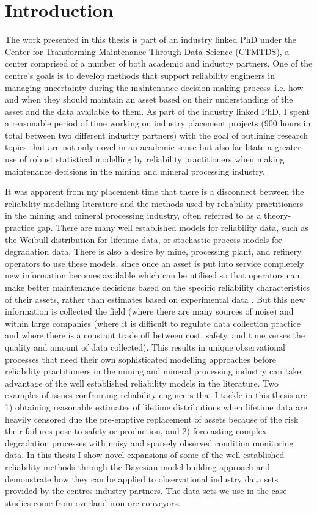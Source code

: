 \chapter{Introduction}\label{chap:chapter1}

The work presented in this thesis is part of an industry linked PhD under the Center for Transforming Maintenance Through Data Science (CTMTDS), a center comprised of a number of both academic and industry partners. One of the centre's goals is to develop methods that support reliability engineers in managing uncertainty during the maintenance decision making process--i.e. how and when they should maintain an asset based on their understanding of the asset and the data available to them. As part of the industry linked PhD, I spent a reasonable period of time working on industry placement projects (900 hours in total between two different industry partners) with the goal of outlining research topics that are not only novel in an academic sense but also facilitate a greater use of robust statistical modelling by reliability practitioners when making maintenance decisions in the mining and mineral processing industry.

It was apparent from my placement time that there is a disconnect between the reliability modelling literature and the methods used by reliability practitioners in the mining and mineral processing industry, often referred to as a theory-practice gap. There are many well established models for reliability data, such as the Weibull distribution for lifetime data, or stochastic process models for degradation data. There is also a desire by mine, processing plant, and refinery operators to use these models, since once an asset is put into service completely new information becomes available which can be utilised so that operators can make better maintenance decisions based on the specific reliability characteristics of their assets, rather than estimates based on experimental data \citep{jardine2013}. But this new information is collected the field (where there are many sources of noise) and within large companies (where it is difficult to regulate data collection practice and where there is a constant trade off between cost, safety, and time verses the quality and amount of data collected). This results in unique observational processes that need their own sophisticated modelling approaches before reliability practitioners in the mining and mineral processing industry can take advantage of the well established reliability models in the literature. Two examples of issues confronting reliability engineers that I tackle in this thesis are 1) obtaining reasonable estimates of lifetime distributions when lifetime data are heavily censored due the pre-emptive replacement of assets because of the risk their failures pose to safety or production, and 2) forecasting complex degradation processes with noisy and sparsely observed condition monitoring data. In this thesis I show novel expansions of some of the well established reliability methods through the Bayesian model building approach \citep{gelman_workflow_2020} and demonstrate how they can be applied to observational industry data sets provided by the centres industry partners. The data sets we use in the case studies come from overland iron ore conveyors.

